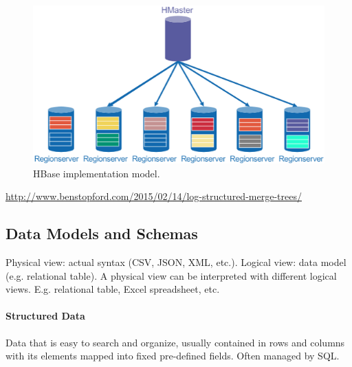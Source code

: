 \begin{figure}[h]
	\centering
	\includegraphics[scale=0.7]{images/3-hb_phys.PNG}
	\caption{HBase implementation model.}
	\label{fig:hb_phys}
\end{figure}





















\url{http://www.benstopford.com/2015/02/14/log-structured-merge-trees/}






\subsection{Data Models and Schemas}

Physical view: actual syntax (CSV, JSON, XML, etc.). Logical view: data model (e.g. relational table). A physical view can be interpreted with different logical views. E.g. relational table, Excel spreadsheet, etc.

\paragraph{Structured Data}
Data that is easy to search and organize, usually contained in rows and columns with its elements mapped into fixed pre-defined fields. Often managed by SQL.

